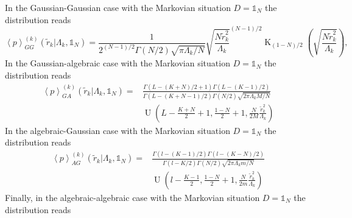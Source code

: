 In the Gaussian-Gaussian case with the Markovian situation $D = \mathbb{1}_{N}$
the distribution reads
\begin{equation}
    \left\langle p \right\rangle_{GG}^{\left(k\right)}
    \left(\tilde{r}_{k} \vert \Lambda_{k}, \mathbb{1}_{N}\right) =
    \frac{1}{2^{\left(N - 1\right) / 2} \Gamma \left(N / 2\right)
    \sqrt{\pi \Lambda_{k} / N}}
    {\sqrt{\frac{N \tilde{r}_{k}^2}{\Lambda_{k}}}}^{\left(N - 1\right) / 2}
    \operatorname{K}_{\left(1 - N\right)/2}
    \left( \sqrt{\frac{N \tilde{r}^2_{k}}{\Lambda_{k}}}\right),
\end{equation}
In the Gaussian-algebraic case with the Markovian situation
$D = \mathbb{1}_{N}$ the distribution reads
\begin{equation}
    \begin{split}
    \left\langle p \right\rangle_{GA}^{\left(k\right)}
    \left(\tilde{r}_{k} \vert \Lambda_{k}, \mathbb{1}_{N}\right) =
    &\frac{\Gamma\left(L - \left(K + N \right) / 2 + 1\right)
    \Gamma\left(L - \left(K - 1\right) / 2\right)}
    {\Gamma\left(L - \left(K + N - 1\right) / 2\right) \Gamma\left(N / 2\right)
    \sqrt{2\pi \Lambda_{k}M/N}} \\
    & \operatorname{U} \left(L - \frac{K + N}{2} + 1, \frac{1 - N}{2} + 1,
    \frac{N}{2M} \frac{\tilde{r}^{2}_{k}}{\Lambda_{k}}\right)
    \end{split}
\end{equation}
In the algebraic-Gaussian case with the Markovian situation
$D = \mathbb{1}_{N}$ the distribution reads
\begin{equation}
    \begin{split}
    \left\langle p \right\rangle_{AG}^{\left(k\right)}
    \left(\tilde{r}_{k} \vert \Lambda_{k}, \mathbb{1}_{N}\right) =
    &\frac{\Gamma\left(l - \left(K - 1 \right) / 2\right)
    \Gamma\left(l - \left(K - N\right) / 2\right)}
    {\Gamma\left(l - K / 2\right) \Gamma\left(N / 2\right)
    \sqrt{2\pi \Lambda_{k}m/N}} \\
    & \operatorname{U} \left(l - \frac{K - 1}{2}, \frac{1 - N}{2} + 1,
    \frac{N}{2m} \frac{\tilde{r}^{2}_{k}}{\Lambda_{k}}\right)
    \end{split}
\end{equation}
Finally, in the algebraic-algebraic case with the Markovian situation
$D = \mathbb{1}_{N}$ the distribution reads
